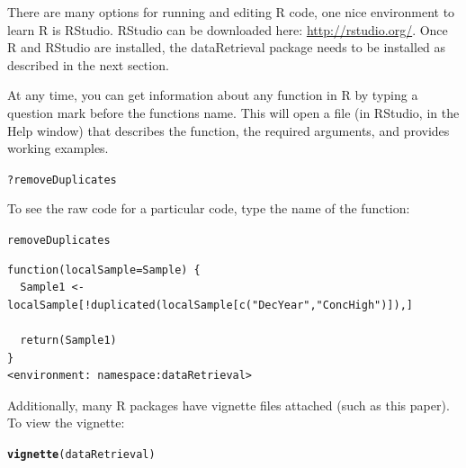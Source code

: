 \documentclass[a4paper,11pt]{article}\usepackage[]{graphicx}\usepackage[]{color}
\makeatletter
\newcommand{\hlopt}[1]{\textcolor[rgb]{0,0,0}{#1}}%
\newcommand{\hlstd}[1]{\textcolor[rgb]{0.345,0.345,0.345}{#1}}%
\newcommand{\hlkwd}[1]{\textcolor[rgb]{0.737,0.353,0.396}{\textbf{#1}}}%
\newenvironment{kframe}{%
 \def\at@end@of@kframe{}%
 \ifinner\ifhmode%
  \def\at@end@of@kframe{\end{minipage}}%
  \begin{minipage}{\columnwidth}%
 \fi\fi%
 \def\FrameCommand##1{\hskip\@totalleftmargin \hskip-\fboxsep
 \colorbox{shadecolor}{##1}\hskip-\fboxsep
     \hskip-\linewidth \hskip-\@totalleftmargin \hskip\columnwidth}%
 \MakeFramed {\advance\hsize-\width
   \@totalleftmargin\z@ \linewidth\hsize
   \@setminipage}}%
 {\par\unskip\endMakeFramed%
 \at@end@of@kframe}
\newenvironment{knitrout}{}{} %
\makeatother
\begin{document}
There are many options for running and editing R code, one nice environment to learn R is RStudio. RStudio can be downloaded here: \url{http://rstudio.org/}. Once R and RStudio are installed, the dataRetrieval package needs to be installed as described in the next section.

At any time, you can get information about any function in R by typing a question mark before the functions name.  This will open a file (in RStudio, in the Help window) that describes the function, the required arguments, and provides working examples.

\begin{knitrout}
\color{fgcolor}\begin{kframe}
\begin{alltt}
\hlopt{?}\hlstd{removeDuplicates}
\end{alltt}
\end{kframe}
\end{knitrout}


To see the raw code for a particular code, type the name of the function:
\begin{knitrout}
\color{fgcolor}\begin{kframe}
\begin{alltt}
\hlstd{removeDuplicates}
\end{alltt}
\begin{verbatim}
function(localSample=Sample) {  
  Sample1 <- localSample[!duplicated(localSample[c("DecYear","ConcHigh")]),]
  
  return(Sample1)
}
<environment: namespace:dataRetrieval>
\end{verbatim}
\end{kframe}
\end{knitrout}


Additionally, many R packages have vignette files attached (such as this paper). To view the vignette:
\begin{knitrout}
\color{fgcolor}\begin{kframe}
\begin{alltt}
\hlkwd{vignette}\hlstd{(dataRetrieval)}
\end{alltt}
\end{kframe}
\end{knitrout}



\end{document}
